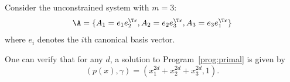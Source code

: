 \begin{myexem}
  \label{exem:simple1}
  Consider the unconstrained system \cite[Example~2.1]{ahmadi2012joint} with $m=3$:
  \[ \A = \{ A_1 = e_1e_2^\Tr , A_2 = e_2e_3^\Tr , A_3 = e_3e_1^\Tr  \} \]
  where $e_i$ denotes the $i$th canonical basis vector.

  One can verify that for any $d$, a solution to Program~\ref{prog:primal} is given by
  \[ (p(x), \gamma) = (x_1^{2d} + x_2^{2d} + x_3^{2d}, 1). \]
\end{myexem}


